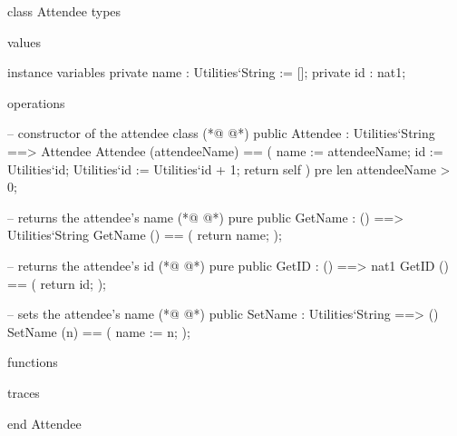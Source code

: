 \begin{vdmpp}[breaklines=true]
class Attendee
types

values

instance variables
 private name : Utilities`String := [];
 private id : nat1;

operations

 -- constructor of the attendee class 
(*@
\label{Attendee:13}
@*)
  public Attendee : Utilities`String ==> Attendee
    Attendee (attendeeName) == (
     name := attendeeName;
     id := Utilities`id;
     Utilities`id := Utilities`id + 1;
     return self
    )
    pre len attendeeName > 0;
    
    
  -- returns the attendee's name
(*@
\label{GetName:24}
@*)
   pure public GetName : () ==> Utilities`String
    GetName () == (
     return name;
    );
    
    
   -- returns the attendee's id
(*@
\label{GetID:31}
@*)
   pure public GetID : () ==> nat1
    GetID () == (
     return id;
    );
    
   -- sets the attendee's name
(*@
\label{SetName:37}
@*)
   public SetName : Utilities`String ==> ()
    SetName (n) == (
     name := n;
    );
   
functions

traces

end Attendee
\end{vdmpp}
